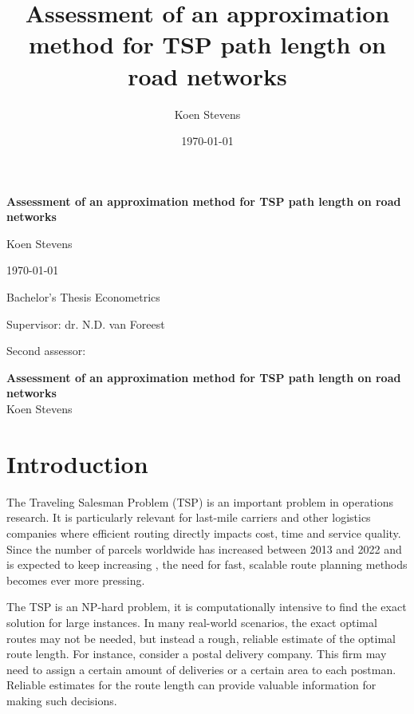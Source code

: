 \documentclass[12pt]{article}
\title{Assessment of an approximation method for TSP path length on road networks}
\author{Koen Stevens}
\date{\today}
\numberwithin{equation}{section}
\newcommand{\1}[1]{\,I_{#1}} %
\begin{document}
\begin{titlepage}
	\centering
	\vspace*{0.3\textheight}
	{\LARGE\bfseries Assessment of an approximation method for TSP path length on road networks \par}
	\vspace{2cm}
	{\Large Koen Stevens \par}
	\vfill
	{\large \today \par} %
\end{titlepage}
\clearpage
\thispagestyle{empty}
\vspace*{0.3\textheight}
{\Large Bachelor's Thesis Econometrics \par}
\vspace{1cm}
{\large Supervisor: dr. N.D. van Foreest \par}
\vspace{0.5cm}
{\large Second assessor:  \par}
\clearpage
{}
\pagestyle{plain}
\begin{center}
	\LARGE \textbf{Assessment of an approximation method for TSP path length on road networks} \\[1.5ex]
	\large Koen Stevens
\end{center}
\begin{abstract}

\end{abstract}
\section{Introduction}
The Traveling Salesman Problem (TSP) is an important problem in operations research.
It is particularly relevant for last-mile carriers and other logistics companies where efficient
routing directly impacts cost, time and service quality. Since the number of parcels worldwide has
increased between 2013 and 2022 and is expected to keep increasing \citep{statista}, the need for
fast, scalable route planning methods becomes ever more pressing.

The TSP is an NP-hard problem, it is computationally intensive to find the exact solution for
large instances. In many real-world scenarios, the exact optimal routes may not be needed, but
instead a rough, reliable estimate of the optimal route length. For instance, consider a postal delivery company.
This firm may need to assign a certain amount of deliveries or a certain area to each postman.
Reliable estimates for the route length can provide valuable information for making such decisions.
\end{document}
